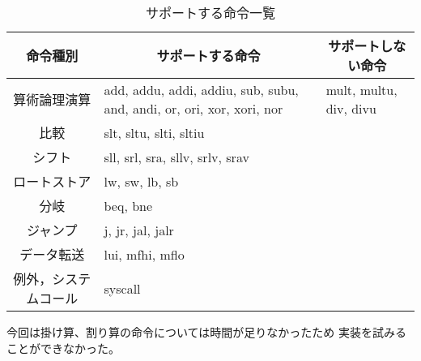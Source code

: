 \documentclass{jarticle}[11pt]
\begin{document}
\begin{table*}[htb] %
\caption{サポートする命令一覧}
\label{サポートする命令一覧}
\begin{center}
\begin{tabular}{c|p{6cm}|p{4cm}}
\hline \hline
命令種別 & 
\multicolumn{1}{c}{サポートする命令} &
\multicolumn{1}{|c}{サポートしない命令} 
\\ \hline

算術論理演算 &
add, addu, addi, addiu, sub, subu, 
and, andi, or, ori, xor, xori, nor &
mult, multu, div, divu
\\

比較 &
slt, sltu, slti, sltiu &
\\

シフト &
sll, srl, sra, sllv, srlv, srav &
\\

ロートストア &
lw, sw, lb, sb &
\\

分岐 & 
beq, bne &
\\

ジャンプ &
j, jr, jal, jalr &
\\

データ転送 &
lui, mfhi, mflo &
\\

例外，システムコール &
syscall &
\\

\hline
\end{tabular}
\end{center}
\end{table*}


今回は掛け算、割り算の命令については時間が足りなかったため
実装を試みることができなかった。



\end{document}
